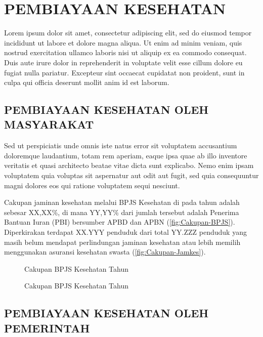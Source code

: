 \chapter{PEMBIAYAAN KESEHATAN}
Lorem ipsum dolor sit amet, consectetur adipiscing elit, sed do eiusmod tempor incididunt ut labore et dolore magna aliqua. Ut enim ad minim veniam, quis nostrud exercitation ullamco laboris nisi ut aliquip ex ea commodo consequat. Duis aute irure dolor in reprehenderit in voluptate velit esse cillum dolore eu fugiat nulla pariatur. Excepteur sint occaecat cupidatat non proident, sunt in culpa qui officia deserunt mollit anim id est laborum.

\section[PEMBIAYAAN MASYARAKAT]{PEMBIAYAAN KESEHATAN OLEH MASYARAKAT}
Sed ut perspiciatis unde omnis iste natus error sit voluptatem accusantium doloremque laudantium, totam rem aperiam, eaque ipsa quae ab illo inventore veritatis et quasi architecto beatae vitae dicta sunt explicabo. Nemo enim ipsam voluptatem quia voluptas sit aspernatur aut odit aut fugit, sed quia consequuntur magni dolores eos qui ratione voluptatem sequi nesciunt.

Cakupan jaminan kesehatan melalui BPJS Kesehatan di \namaKabupaten pada tahun \tP adalah sebesar XX,XX\%, di mana YY,YY\% dari jumlah tersebut adalah Penerima Bantuan Iuran (PBI) bersumber APBD dan APBN (\autoref{fig:Cakupan-BPJS}). Diperkirakan terdapat XX.YYY penduduk dari total YY.ZZZ penduduk yang masih belum mendapat perlindungan jaminan kesehatan atau lebih memilih menggunakan asuransi kesehatan swasta (\autoref{fig:Cakupan-Jamkes}).

\begin{figure}[H]
    \centering{}
    \caption{Cakupan BPJS Kesehatan \namaKabupaten Tahun \tP}
    \label{fig:Cakupan-BPJS}
\end{figure}

\begin{figure}[H]
    \centering{}
    \caption{Cakupan BPJS Kesehatan \namaKabupaten Tahun \tP}
    \label{fig:Cakupan-Jamkes}
\end{figure}


\section[PEMBIAYAAN PEMERINTAH]{PEMBIAYAAN KESEHATAN OLEH PEMERINTAH}
